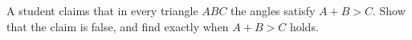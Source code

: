A student claims that in every triangle $ABC$ the angles satisfy $A+B>C$. Show that the claim is false, and find exactly when $A+B>C$ holds.
